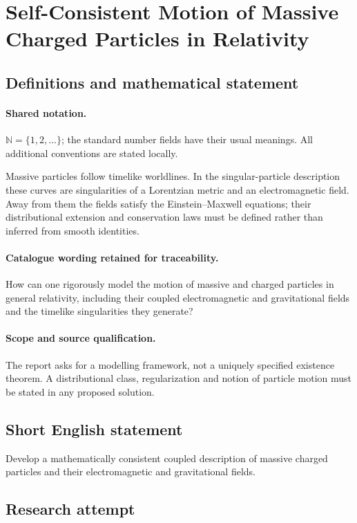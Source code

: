 \documentclass[11pt]{article}
\begin{document}
\section{Self-Consistent Motion of Massive Charged Particles in Relativity}\label{statement}

\subsection{Definitions and mathematical statement}

\paragraph{Shared notation.}$\mathbb N=\{1,2,\ldots\}$; the standard number fields have their usual meanings. All additional conventions are stated locally.


Massive particles follow timelike worldlines. In the singular-particle description these curves are singularities of a Lorentzian metric and an electromagnetic field. Away from them the fields satisfy the Einstein--Maxwell equations; their distributional extension and conservation laws must be defined rather than inferred from smooth identities.

\paragraph{Catalogue wording retained for traceability.}
How can one rigorously model the motion of massive and charged particles in general relativity, including their coupled electromagnetic and gravitational fields and the timelike singularities they generate?

\paragraph{Scope and source qualification.}The report asks for a modelling framework, not a uniquely specified existence theorem. A distributional class, regularization and notion of particle motion must be stated in any proposed solution.
\subsection{Short English statement}
Develop a mathematically consistent coupled description of massive charged particles and their electromagnetic and gravitational fields.
\subsection{Research attempt}
\end{document}

